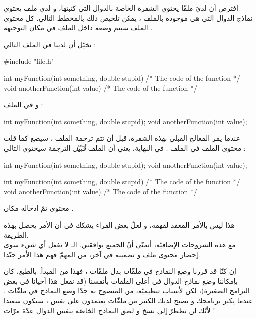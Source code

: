 افترض أن لديّ ملفّا
يحتوي الشفرة الخاصة بالدوال التي كتبتها، و لدي ملف
يحتوي نماذج الدوال التي هي موجودة بالملف
،
يمكن تلخيص ذلك بالمخطط التالي.
كل محتوى الملف
سيتم وضعه داخل الملف
في مكان التوجيهة
.

تخيّل أن لدينا في الملف
التالي :
\begin{Csource}
#include "file.h"

int myFunction(int something, double stupid)
{
  /* The code of the function */
}
void anotherFunction(int value)
{
  /* The code of the function */
}
\end{Csource}
و في الملف
 :
\begin{Csource}
int myFunction(int something, double stupid);
void anotherFunction(int value);
\end{Csource}
عندما يمر المعالج القبلي بهذه الشفرة، قبل أن تتم ترجمة الملف
،
سيضع كما قلت محتوى الملف
 في الملف
.
في النهاية، يعني أن الملف
\textit{قُبَيْل}
الترجمة سيحتوي التالي :
\begin{Csource}
int myFunction(int something, double stupid);
void anotherFunction(int value);

int myFunction(int something, double stupid)
{
  /* The code of the function */
}
void anotherFunction(int value)
{
  /* The code of the function */
}
\end{Csource}
محتوى
تمّ ادخاله مكان
.

هذا ليس بالأمر المعقد لفهمه، و لعلّ بعض القراء يشكك في أن الأمر يحصل بهذه الطريقة.\\
مع هذه الشروحات الإضافيّة، أتمنّى أنّ الجميع يوافقني.
الـ
لا تفعل أي شيء سوى إحضار محتوى ملف و تضمينه في آخر، من المهمّ فهم هذا الأمر جيّدا.
\begin{information}
  إن كنّا قد قررنا وضع النماذج في ملفّات
بدل ملفّات
،
فهذا من المبدأ.
بالطبع، كان بإمكاننا وضع نماذج الدوال في أعلى الملفات
بأنفسنا (قد نفعل هذا أحيانا في بعض البرامج الصغيرة)، لكن لأسباب تنظيميّة، من المنصوح به جدّا وضع النماذج في ملفّات
.
 عندما يكبر برنامجك و يصبح لديك الكثير من ملفّات
يعتمدون على نفس
،
ستكون سعيدا لأنّك لن تظطرّ إلى نسخ و لصق النماذج الخاصّة بنفس الدوال عدّة مرّات !
\end{information}

